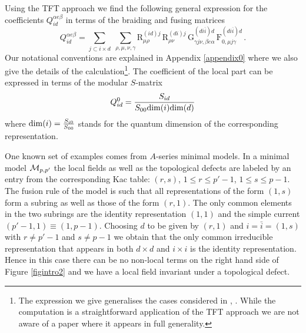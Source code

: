 \documentclass[a4paper,11pt]{article}
\theoremstyle{plain}
\theoremstyle{definition}
\def\be{\begin{equation}}
\def\ee{\end{equation}}
\begin{document}
Using the TFT approach \cite{FRS1,FRS2,FRS3,FRS4,FRS5} we find the following general expression for the coefficients $Q^{\alpha e\beta}_{id}$ 
in terms of the braiding and fusing matrices
\begin{equation}\label{Qgeneral}
    Q^{\alpha e\beta}_{id}=\sum_{j\subset i\times d}\;\sum_{\rho,\mu,\nu,\gamma}\mathrm{R}^{(id)j}_{\mu\rho}\, \mathrm{R}^{(di)j}_{\rho\nu}\, \mathrm{G}^{(di\overline{i})d}_{\gamma j \nu,\beta e \alpha}\,\mathrm{F}^{(di\overline{i})d}_{0,\mu j\gamma} \, .
\end{equation}
Our notational conventions are explained in Appendix \ref{appendix0} where we also give the details of the calculation\footnote{The expression we give generalises the cases considered in  \cite{FFRS}, \cite{Runkelcharges}. While the computation is a straightforward application of the TFT approach we are not aware of a paper where it appears in full generality.}.
The coefficient of the local part can be expressed in terms of the modular $S$-matrix  \cite{PZ}
\be
Q^0_{id} = \frac{S_{id}}{S_{00} {\rm dim}(i) {\rm dim}(d)}
\ee
where ${\rm dim}(i)=\frac{S_{i0}}{S_{00}}$ stands for the quantum dimension of the corresponding representation. 


One known set of examples  comes from $A$-series minimal models.
In a minimal model ${\cal M}_{p,p'}$ the local fields as well as  the topological defects are labeled by an entry from the corresponding Kac table: $ (r,s)$, $1\le r\le p'-1$, $1\le s \le p-1$.   The fusion rule of the model is such that all representations of the form $(1,s)$ form a subring as well as those of the form $(r,1)$. 
The only common elements in the two subrings are the identity representation $(1,1)$ and the simple current $(p'-1,1)\equiv (1,p-1)$.
   Choosing $d$ to be given by  $(r,1)$ and $i=\bar i=(1,s)$ with $r\ne p'-1$ and $s\ne p-1$ we obtain that the only common irreducible representation 
   that appears in both $d\times d$ and $i\times i$ is the identity representation. Hence in this case there can be no non-local terms on the right hand side of 
Figure \ref{figintro2} and we have a local field invariant under a topological defect. 
\end{document}
